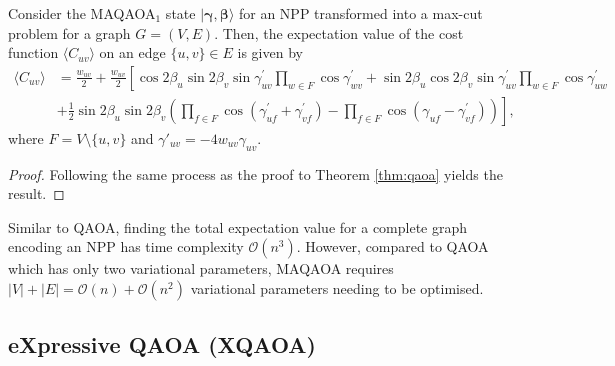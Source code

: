     \begin{widetext}
    \begin{theorem} \label{thm:maqaoa}
        Consider the MAQAOA$_1$ state $|\mathbf{\gamma,\beta}\rangle$ for an NPP transformed into a max-cut problem for a graph $G=(V,E)$. Then, the expectation value of the cost function $\langle C_{uv}\rangle$ on an edge $\{u,v\}\in E$ is given by
        \begin{align*}
            \langle C_{u v}\rangle & =\frac{w_{u v}}{2}+\frac{w_{u v}}{2}\left[\cos 2 \beta_u \sin 2 \beta_v \sin \gamma_{u v}^{\prime} \prod_{w \in F} \cos \gamma_{w v}^{\prime}+\sin 2 \beta_u \cos 2 \beta_v \sin \gamma_{u v}^{\prime} \prod_{w \in F} \cos \gamma_{u w}^{\prime}\right. \\ 
            & \left.+\frac{1}{2} \sin 2 \beta_u \sin 2 \beta_v \left(\prod_{f \in F} \cos \left(\gamma_{u f}^{\prime}+\gamma_{v f}^{\prime}\right)-\prod_{f \in F} \cos \left(\gamma_{u f}-\gamma_{v f}^{\prime}\right)\right)\right],
        \end{align*}
        where $F = V\setminus\{u,v\}$ and $\gamma'_{uv} = -4w_{uv}\gamma_{uv}$.
    \end{theorem}
    \end{widetext}
    \begin{proof}
        Following the same process as the proof to Theorem \ref{thm:qaoa} yields the result.
    \end{proof}


    Similar to QAOA, finding the total expectation value for a complete graph encoding an NPP has time complexity $\mathcal{O}(n^3)$. However, compared to QAOA which has only two variational parameters, MAQAOA requires $|V|+|E|=\mathcal{O}(n)+\mathcal{O}(n^2)$ variational parameters needing to be optimised.

\subsection{eXpressive QAOA (XQAOA)}

